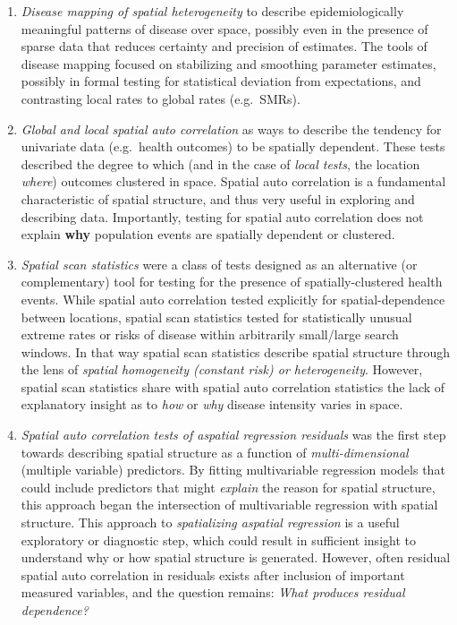 \documentclass[
]{book}
\providecommand{\tightlist}{%
  \setlength{\itemsep}{0pt}\setlength{\parskip}{0pt}}
\begin{document}
\begin{enumerate}
\def\labelenumi{\arabic{enumi}.}
\tightlist
\item
  \emph{Disease mapping of spatial heterogeneity} to describe epidemiologically meaningful patterns of disease over space, possibly even in the presence of sparse data that reduces certainty and precision of estimates. The tools of disease mapping focused on stabilizing and smoothing parameter estimates, possibly in formal testing for statistical deviation from expectations, and contrasting local rates to global rates (e.g.~SMRs).
\item
  \emph{Global and local spatial auto correlation} as ways to describe the tendency for univariate data (e.g.~health outcomes) to be spatially dependent. These tests described the degree to which (and in the case of \emph{local tests}, the location \emph{where}) outcomes clustered in space. Spatial auto correlation is a fundamental characteristic of spatial structure, and thus very useful in exploring and describing data. Importantly, testing for spatial auto correlation does not explain \textbf{why} population events are spatially dependent or clustered.
\item
  \emph{Spatial scan statistics} were a class of tests designed as an alternative (or complementary) tool for testing for the presence of spatially-clustered health events. While spatial auto correlation tested explicitly for spatial-dependence between locations, spatial scan statistics tested for statistically unusual extreme rates or risks of disease within arbitrarily small/large search windows. In that way spatial scan statistics describe spatial structure through the lens of \emph{spatial homogeneity (constant risk) or heterogeneity}. However, spatial scan statistics share with spatial auto correlation statistics the lack of explanatory insight as to \emph{how} or \emph{why} disease intensity varies in space.
\item
  \emph{Spatial auto correlation tests of aspatial regression residuals} was the first step towards describing spatial structure as a function of \emph{multi-dimensional} (multiple variable) predictors. By fitting multivariable regression models that could include predictors that might \emph{explain} the reason for spatial structure, this approach began the intersection of multivariable regression with spatial structure. This approach to \emph{spatializing aspatial regression} is a useful exploratory or diagnostic step, which could result in sufficient insight to understand why or how spatial structure is generated. However, often residual spatial auto correlation in residuals exists after inclusion of important measured variables, and the question remains: \emph{What produces residual dependence?}
\end{enumerate}
\end{document}
